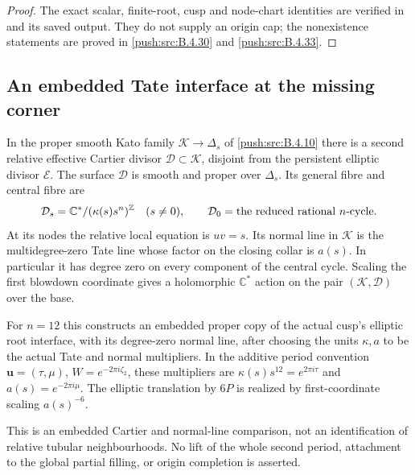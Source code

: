 \begin{proof}
The exact scalar, finite-root, cusp and node-chart
identities are verified in
 and its
saved output. They do not supply an origin cap; the
nonexistence statements are proved in \ref{push:src:B.4.30} and \ref{push:src:B.4.33}.
\end{proof}

\subsection{An embedded Tate interface at the missing corner}

\begin{proposition}\label{push:src:B.4.20}
\label{push:B420}
In the proper smooth Kato family $\mathcal K\to\Delta_s$
of \ref{push:src:B.4.10} there is a second relative effective Cartier
divisor $\mathcal D\subset\mathcal K$, disjoint from
the persistent elliptic divisor $\mathcal E$.
The surface $\mathcal D$ is smooth and proper over
$\Delta_s$. Its general fibre and central fibre are
\[
 \mathcal D_s=\mathbb C^*/(\kappa(s)s^n)^\mathbb Z
 \quad(s\ne0),\qquad
 \mathcal D_0=\hbox{the reduced rational }n\hbox{-cycle}.
\]
At its nodes the relative local equation is $uv=s$.
Its normal line in $\mathcal K$ is the multidegree-zero
Tate line whose factor on the closing collar is $a(s)$.
In particular it has degree zero on every component
of the central cycle. Scaling the first blowdown
coordinate gives a holomorphic $\mathbb C^*$ action
on the pair $(\mathcal K,\mathcal D)$ over the base.

For $n=12$ this constructs an embedded proper copy of
the actual cusp's elliptic root interface, with its
degree-zero normal line, after choosing the units
$\kappa,a$ to be the actual Tate and normal multipliers.
In the additive period convention $\mathbf u=(\tau,\mu)$,
$W=e^{-2\pi i\zeta_2}$, these multipliers are
$\kappa(s)s^{12}=e^{2\pi i\tau}$ and
$a(s)=e^{-2\pi i\mu}$. The elliptic translation by
$6P$ is realized by first-coordinate scaling
$a(s)^{-6}$.

This is an embedded Cartier and normal-line comparison,
not an identification of relative tubular neighbourhoods.
No lift of the whole second period, attachment to the
global partial filling, or origin completion is asserted.
\end{proposition}


